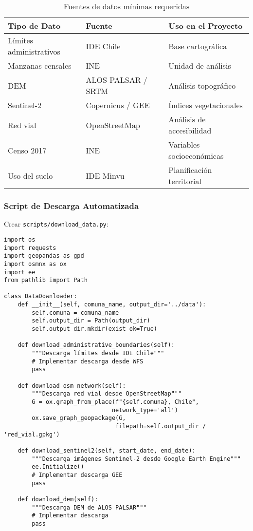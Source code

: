 \documentclass[12pt,a4paper]{article}
\begin{document}
\begin{table}[H]
\centering
\begin{tabular}{llp{5cm}}
\toprule
\textbf{Tipo de Dato} & \textbf{Fuente} & \textbf{Uso en el Proyecto} \\
\midrule
Límites administrativos & IDE Chile & Base cartográfica \\
Manzanas censales & INE & Unidad de análisis \\
DEM & ALOS PALSAR / SRTM & Análisis topográfico \\
Sentinel-2 & Copernicus / GEE & Índices vegetacionales \\
Red vial & OpenStreetMap & Análisis de accesibilidad \\
Censo 2017 & INE & Variables socioeconómicas \\
Uso del suelo & IDE Minvu & Planificación territorial \\
\bottomrule
\end{tabular}
\caption{Fuentes de datos mínimas requeridas}
\end{table}

\subsubsection{Script de Descarga Automatizada}

Crear \texttt{scripts/download\_data.py}:

\begin{verbatim}
import os
import requests
import geopandas as gpd
import osmnx as ox
import ee
from pathlib import Path

class DataDownloader:
    def __init__(self, comuna_name, output_dir='../data'):
        self.comuna = comuna_name
        self.output_dir = Path(output_dir)
        self.output_dir.mkdir(exist_ok=True)

    def download_administrative_boundaries(self):
        """Descarga límites desde IDE Chile"""
        # Implementar descarga desde WFS
        pass

    def download_osm_network(self):
        """Descarga red vial desde OpenStreetMap"""
        G = ox.graph_from_place(f"{self.comuna}, Chile",
                               network_type='all')
        ox.save_graph_geopackage(G,
                                filepath=self.output_dir / 'red_vial.gpkg')

    def download_sentinel2(self, start_date, end_date):
        """Descarga imágenes Sentinel-2 desde Google Earth Engine"""
        ee.Initialize()
        # Implementar descarga GEE
        pass

    def download_dem(self):
        """Descarga DEM de ALOS PALSAR"""
        # Implementar descarga
        pass
\end{verbatim}
\end{document}
